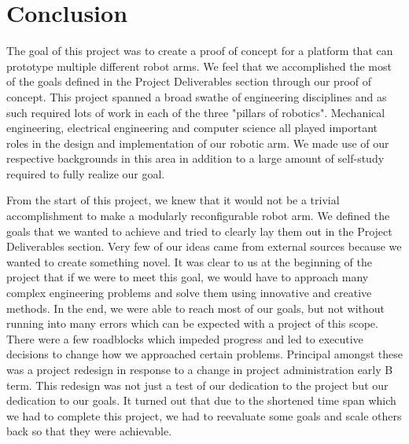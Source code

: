 \section{Conclusion}

The goal of this project was to create a proof of concept for a platform that can prototype multiple different robot arms. We feel that we accomplished the most of the goals defined in the Project Deliverables section through our proof of concept. This project spanned a broad swathe of engineering disciplines and as such required lots of work in each of the three "pillars of robotics". Mechanical engineering, electrical engineering and computer science all played important roles in the design and implementation of our robotic arm. We made use of our respective backgrounds in this area in addition to a large amount of self-study required to fully realize our goal. 

\noindent From the start of this project, we knew that it would not be a trivial accomplishment to make a modularly reconfigurable robot arm. We defined the goals that we wanted to achieve and tried to clearly lay them out in the Project Deliverables section. Very few of our ideas came from external sources because we wanted to create something novel. It was clear to us at the beginning of the project that if we were to meet this goal, we would have to approach many complex engineering problems and solve them using innovative and creative methods. In the end, we were able to reach most of our goals, but not without running into many errors which can be expected with a project of this scope. There were a few roadblocks which impeded progress and led to executive decisions to change how we approached certain problems. Principal amongst these was a project redesign in response to a change in project administration early B term. This redesign was not just a test of our dedication to the project but our dedication to our goals. It turned out that due to the shortened time span which we had to complete this project, we had to reevaluate some goals and scale others back so that they were achievable. 

